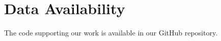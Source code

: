 
\section{Data Availability}
\label{sec:data_ava}
The code supporting our work is available in our GitHub repository.